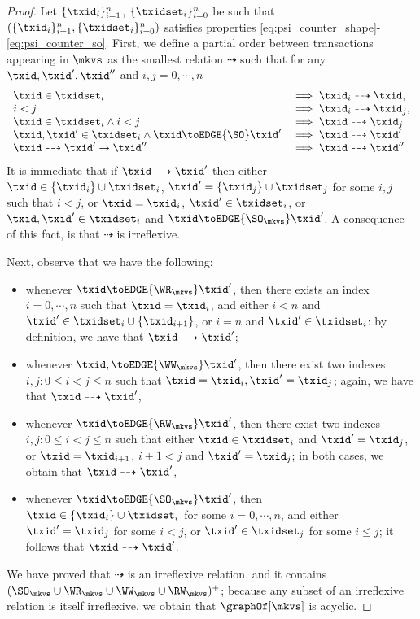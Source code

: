 \begin{proof}
Let $\{\txid_{i}\}_{i=1}^{n}$, $\{\txidset_{i}\}_{i=0}^{n}$ 
be such that $(\{\txid_{i}\}_{i=1}^{n}, \{\txidset_{i}\}_{i=0}^{n})$ 
satisfies properties \eqref{eq:psi_counter_shape}-\eqref{eq:psi_counter_so}. 
First, we define a partial order between transactions appearing in $\mkvs$ 
as the smallest relation $\dashrightarrow$ such that for any $\txid, \txid', \txid''$ and 
$i,j = 0,\cdots, n$
\[
\begin{array}{ll}
\txid \in \txidset_{i} &\implies \txid_{i} \dashrightarrow \txid,\\
i < j &\implies \txid_{i} \dashrightarrow \txid_{j},\\
\txid \in \txidset_{i} \land i < j & \implies \txid \dashrightarrow \txid_{j}\\
\txid, \txid' \in \txidset_{i} \land \txid \toEDGE{\SO} \txid' &\implies \txid \dashrightarrow \txid'\\
\txid \dashrightarrow \txid' \rightarrow \txid'' &\implies \txid \dashrightarrow \txid''
\end{array}
\]
It is immediate that if $\txid \dashrightarrow \txid'$ then either $\txid \in \{\txid_{i}\} \cup \txidset_i$, 
$\txid' = \{\txid_{j}\} \cup \txidset_{j}$ for some $i,j$ such that $i < j$, or $\txid = \txid_{i}$, $\txid' \in \txidset_i$, 
or $\txid, \txid' \in \txidset_{i}$ and $\txid \toEDGE{\SO_{\mkvs}} \txid'$. A consequence of this fact, 
is that $\dashrightarrow$ is irreflexive.

Next, observe that we have the following: 
\begin{itemize}
\item whenever $\txid \toEDGE{\WR_{\mkvs}} \txid'$, then 
there exists an index $i = 0,\cdots, n$ such that $\txid = \txid_{i}$, 
and either $i < n$ and $\txid' \in \txidset_{i} \cup \{ \txid_{i+1} \}$, 
or $i = n$ and $\txid' \in \txidset_{i}$: by definition, we have that $\txid \dashrightarrow \txid'$;
\item whenever $\txid, \toEDGE{\WW_{\mkvs}} \txid'$, 
then there exist two indexes $i, j: 0 \leq i < j \leq n$ such that 
$\txid = \txid_{i}, \txid' = \txid_{j}$; again, we have that $\txid \dashrightarrow \txid'$, 
\item whenever $\txid \toEDGE{\RW_{\mkvs}} \txid'$, then 
there exist two indexes $i, j: 0 \leq i < j \leq n$ such that either 
$\txid \in \txidset_{i}$ and $\txid' = \txid_{j}$, or $\txid = \txid_{i+1}$, 
$i+1 < j$ and $\txid' = \txid_{j}$; in both cases, we obtain that $\txid \dashrightarrow \txid'$,
\item whenever $\txid \toEDGE{\SO_{\mkvs}} \txid'$, then 
$\txid \in \{\txid_{i}\} \cup \txidset_{i}$ for some $i=0,\cdots,n$, 
and either $\txid' = \txid_{j}$ for some $i < j$,  or $\txid' \in \txidset_{j}$ for 
some $i \leq j$; it follows that $\txid \dashrightarrow \txid'$.
\end{itemize}

We have proved that $\dashrightarrow$ is an irreflexive relation, and it contains $(\SO_{\mkvs} \cup \WR_{\mkvs} \cup \WW_{\mkvs} \cup \RW_{\mkvs})^+$; 
because any subset of an irreflexive relation is itself irreflexive, we obtain that $\graphOf[\mkvs]$ is acyclic.
\end{proof}


